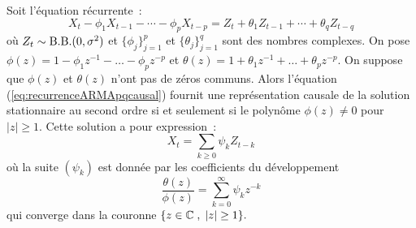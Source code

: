\begin{theorem}
\label{theo:ARMApq_causal}
Soit l'\'equation r\'ecurrente~:
\begin{equation}
 \label{eq:recurrenceARMApqcausal}
  X_t - \phi_1 X_{t-1} - \cdots - \phi_p X_{t-p}
  =
  Z_t + \theta_1 Z_{t-1} + \cdots + \theta_q Z_{t-q}
\end{equation} o\`u $Z_t \sim \mathrm{B.B.}(0,\sigma^2)$ et
$\{ \phi_j \}_{j = 1}^p$ et $\{ \theta_j \}_{j=1}^q$ sont des nombres complexes. On pose
$\phi(z)= 1 - \phi_1 z^{-1} - \dots - \phi_p z^{-p}$ et $\theta(z)= 1 +
\theta_1 z^{-1} + \dots + \theta_p z^{-p}$. On suppose que $\phi(z)$ et
$\theta(z)$ n'ont pas de z\'eros communs. Alors l'\'equation
(\ref{eq:recurrenceARMApqcausal})
fournit une repr\'esentation causale de la solution stationnaire au second ordre
si et seulement si le polyn\^ome $\phi(z)
\neq 0$ pour $|z| \geq 1$. Cette solution a pour
expression~:
\begin{equation}
 \label{eq:solutionARMApq_causal}
  X_t = \sum_{k\geq 0} \psi_k Z_{t-k}
\end{equation}
o\`u la suite $(\psi_k)$ est donn\'ee par les coefficients du d\'eveloppement
$$
\frac{\theta(z)}{\phi(z)}=\sum_{k=0}^{\infty} \psi_k z^{-k}
$$
qui converge dans la couronne $\{z\in\mathbb{C}\;,\;|z|\geq 1\}.$
\end{theorem}
